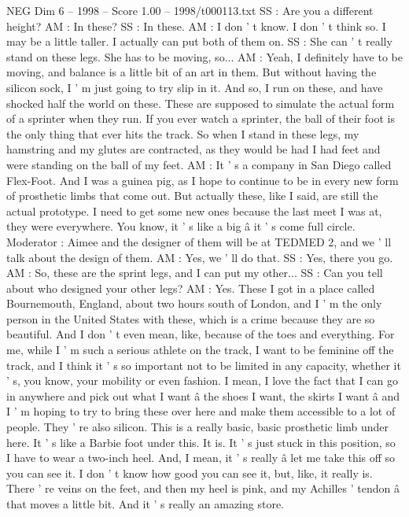 \begin{textsample}{NEG Dim 6 – 1998 – Score 1.00 – 1998/t000113.txt}
SS : Are you a different height?
AM : In these?
SS : In these.
AM : I don ' t know.
I don ' t think so.
I may be a little taller.
I actually can put both of them on.
SS : She can ' t really stand on these legs.
She has to be moving, so...
AM : Yeah, I definitely have to be moving, and balance is a little bit of an art in them.
But without having the silicon sock, I ' m just going to try slip in it.
And so, I run on these, and have shocked half the world on these.
These are supposed to simulate the actual form of a sprinter when they run.
If you ever watch a sprinter, the ball of their foot is the only thing that ever hits the track.
So when I stand in these legs, my hamstring and my glutes are contracted, as they would be had I had feet and were standing on the ball of my feet.
AM : It ' s a company in San Diego called Flex-Foot.
And I was a guinea pig, as I hope to continue to be in every new form of prosthetic limbs that come out.
But actually these, like I said, are still the actual prototype.
I need to get some new ones because the last meet I was at, they were everywhere.
You know, it ' s like a big â it ' s come full circle.
Moderator : Aimee and the designer of them will be at TEDMED 2, and we ' ll talk about the design of them.
AM : Yes, we ' ll do that.
SS : Yes, there you go.
AM : So, these are the sprint legs, and I can put my other...
SS : Can you tell about who designed your other legs?
AM : Yes.
These I got in a place called Bournemouth, England, about two hours south of London, and I ' m the only person in the United States with these, which is a crime because they are so beautiful.
And I don ' t even mean, like, because of the toes and everything.
For me, while I ' m such a serious athlete on the track, I want to be feminine off the track, and I think it ' s so important not to be limited in any capacity, whether it ' s, you know, your mobility or even fashion.
I mean, I love the fact that I can go in anywhere and pick out what I want â the shoes I want, the skirts I want â and I ' m hoping to try to bring these over here and make them accessible to a lot of people.
They ' re also silicon.
This is a really basic, basic prosthetic limb under here.
It ' s like a Barbie foot under this.
It is.
It ' s just stuck in this position, so I have to wear a two-inch heel.
And, I mean, it ' s really â let me take this off so you can see it.
I don ' t know how good you can see it, but, like, it really is.
There ' re veins on the feet, and then my heel is pink, and my Achilles ' tendon â that moves a little bit.
And it ' s really an amazing store.

\end{textsample}
